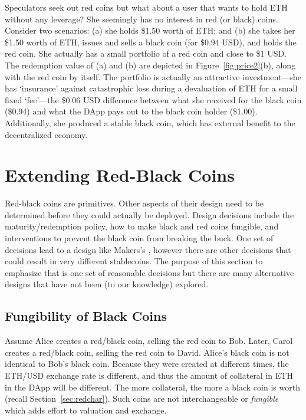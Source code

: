 Speculators seek out red coins but what about a user that wants to hold ETH without any leverage? She seemingly has no interest in red (or black) coins. Consider two scenarios: (a) she holds \$1.50 worth of ETH; and (b) she takes her \$1.50 worth of ETH, issues and sells a black coin (\eg for \$0.94 USD), and holds the red coin. She actually has a small portfolio of a red coin and close to \$1 USD. The redemption value of (a) and (b) are depicted in Figure~\ref{fig:price2}(b), along with the red coin by itself. The portfolio is actually an attractive investment---she has `insurance' against catastrophic loss during a devaluation of ETH for a small fixed `fee'---the \$0.06 USD difference between what she received for the black coin (\$0.94) and what the DApp pays out to the black coin holder (\$1.00). Additionally, she produced a stable black coin, which has external benefit to the decentralized economy. 



\section{Extending Red-Black Coins}

Red-black coins are primitives. Other aspects of their design need to be determined before they could actually be deployed. Design decisions include the maturity/redemption policy, how to make black and red coins fungible, and interventions to prevent the black coin from breaking the buck. One set of decisions lead to a design like Makers's \dai, however there are other decisions that could result in very different stablecoins. The purpose of this section to emphasize that \dai is one set of reasonable decisions but there are many alternative designs that have not been (to our knowledge) explored.


\subsection{Fungibility of Black Coins}

Assume Alice creates a red/black coin, selling the red coin to Bob. Later, Carol creates a red/black coin, selling the red coin to David. Alice's black coin is not identical to Bob's black coin. Because they were created at different times, the ETH/USD exchange rate is different, and thus the  amount of collateral in ETH in the DApp will be different. The more collateral, the more a black coin is worth (recall Section~\ref{sec:redchar}). Such coins are not interchangeable or \textit{fungible} which adds effort to valuation and exchange. 

